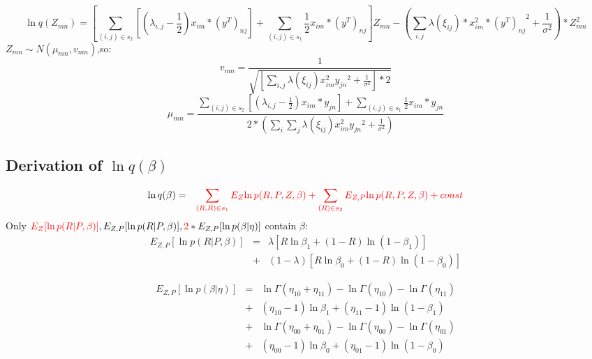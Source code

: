 \documentclass[11pt]{report}
\begin{document}
\begin{equation}
    \ln q(Z_{mn})=[\sum_{(i,j)\in s_2}[(\lambda_{i,j}-\frac{1}{2})x_{im}*(y^{T})_{nj}]+\sum_{(i,j)\in s_1}\frac{1}{2}x_{im}*(y^{T})_{nj}]Z_{mn}-(\sum_{i,j}\lambda(\xi_{ij})*x^{2}_{im}*{(y^{T})_{nj}}^{2}+\frac{1}{\sigma^{2}})*Z^{2}_{mn}
\end{equation}
$Z_{mn}\sim N(\mu_{mn},v_{mn})$,so:
\begin{equation}
    v_{mn} = \frac{1}{\sqrt{[\sum_{i,j}\lambda(\xi_{ij})x^{2}_{im}{y_{jn}}^{2}+\frac{1}{\sigma^2}]*2}}
\end{equation}
\begin{equation}
    \mu_{mn} =\frac{\sum_{(i,j)\in s_2}[(\lambda_{i,j}-\frac{1}{2})x_{im}*y_{jn}]+\sum_{(i,j)\in s_1}\frac{1}{2}x_{im}*y_{jn}}{2*(\sum_{i}\sum_{j}\lambda(\xi_{ij})x^{2}_{im}{y_{jn}}^{2}+\frac{1}{\sigma^2})}
\end{equation}



\subsection{Derivation of $\ln q(\beta)$}
\begin{eqnarray*}
    \ln q(\beta) 
    &=& \textcolor{red}{\sum_{(R,R)\in s_1}E_{Z}{\ln p(R,P,Z,\beta)} + \sum_{(R)\in s_2}E_{Z,P}{\ln p(R,P,Z,\beta)} + const }%
\end{eqnarray*}
Only $\textcolor{red}{E_{Z}[\ln p(R|P,\beta)]}, E_{Z,P}[\ln p(R|P,\beta)],\textcolor{red}{2}*E_{Z,P}[\ln p(\beta|\eta)]$ contain $\beta$:
\begin{eqnarray*}
    E_{Z,P}[\ln p(R|P,\beta)]&=&\lambda[R\ln\beta_{1}+(1-R)\ln (1-\beta_{1})]\\
    &+& (1-\lambda)[R\ln\beta_{0}+(1-R)\ln(1-\beta_{0})]
\end{eqnarray*}

\begin{eqnarray*}
    E_{Z,P}[\ln p(\beta|\eta)] &=& \ln \Gamma(\eta_{10}+\eta_{11}) - \ln \Gamma(\eta_{10})-\ln\Gamma(\eta_{11}) \\
    &+& (\eta_{10}-1)\ln\beta_{1}+(\eta_{11}-1)\ln(1-\beta_1) \\
    &+&\ln \Gamma(\eta_{00}+\eta_{01}) - \ln \Gamma(\eta_{00})-\ln\Gamma(\eta_{01}) \\
    &+&(\eta_{00}-1)\ln\beta_{0}+(\eta_{01}-1)\ln(1-\beta_0)
\end{eqnarray*}
\end{document}
